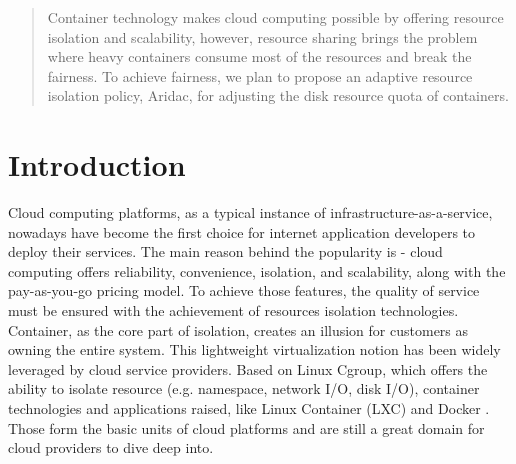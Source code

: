 \documentclass[10pt, conference,compsoc]{IEEEtran}
\begin{document}




\maketitle

\begin{abstract}
Container technology makes cloud computing possible by offering resource isolation and scalability, however, resource sharing brings the problem where heavy containers consume most of the resources and break the fairness. To achieve fairness, we plan to propose an adaptive resource isolation policy, Aridac, for adjusting the disk resource quota of containers.
\end{abstract}





%
\IEEEpeerreviewmaketitle



\section{Introduction}
Cloud computing platforms, as a typical instance of infrastructure-as-a-service, nowadays have become the first choice for internet application developers to deploy their services. The main reason behind the popularity is - cloud computing offers reliability, convenience, isolation, and scalability, along with the pay-as-you-go pricing model. To achieve those features, the quality of service must be ensured with the achievement of resources isolation technologies.\\

Container, as the core part of isolation, creates an illusion for customers as owning the entire system. This lightweight virtualization notion has been widely leveraged by cloud service providers. Based on Linux Cgroup, which offers the ability to isolate resource (e.g. namespace, network I/O, disk I/O), container technologies and applications raised, like Linux Container (LXC) \cite{lxc} and Docker \cite{docker}. Those form the basic units of cloud platforms and are still a great domain for cloud providers to dive deep into. \\
\end{document}

